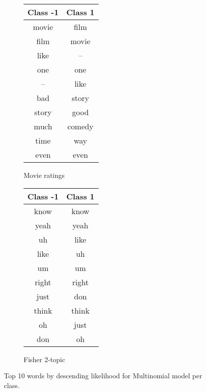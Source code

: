 \documentclass[10pt,a4paper]{article}
\begin{document}
\begin{figure}[H]
\centering
\begin{subfigure}{0.3\textwidth}
\begin{tabular}{|c|c|}
\hline
Class -1 & Class 1 \\
\hline
movie &  film\\
film  &  movie\\
like  &  --\\
one   &  one\\
--    &  like\\
bad   &  story\\
story &  good\\
much  &  comedy\\
time  &  way\\
even  &  even\\
\hline
\end{tabular}
\caption{Movie ratings}
\end{subfigure}%
\begin{subfigure}{0.3\textwidth}
\begin{tabular}{|c|c|}
\hline
Class -1 & Class 1 \\
\hline
know  &  know\\
yeah  &  yeah\\
uh    &  like\\
like  &  uh\\
um    &  um\\
right &  right\\
just  &  don\\
think &  think\\
oh    &  just\\
don   &  oh\\
\hline
\end{tabular}
\caption{Fisher 2-topic}
\end{subfigure}
\caption{Top 10 words by descending likelihood for Multinomial model per class.}
\end{figure}
\end{document}
